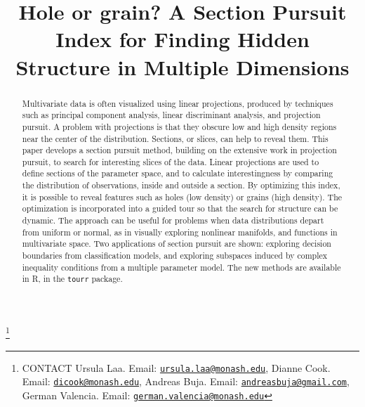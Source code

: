 \documentclass[]{interact}
\theoremstyle{plain}%
\theoremstyle{definition}
\theoremstyle{remark}
\begin{document}
\articletype{}

\title{Hole or grain? A Section Pursuit Index for Finding Hidden Structure in
Multiple Dimensions}


\author{
}

\thanks{CONTACT Ursula Laa. Email: \href{mailto:ursula.laa@monash.edu}{\nolinkurl{ursula.laa@monash.edu}}, Dianne Cook. Email: \href{mailto:dicook@monash.edu}{\nolinkurl{dicook@monash.edu}}, Andreas Buja. Email: \href{mailto:andreasbuja@gmail.com}{\nolinkurl{andreasbuja@gmail.com}}, German Valencia. Email: \href{mailto:german.valencia@monash.edu}{\nolinkurl{german.valencia@monash.edu}}}

\maketitle

\begin{abstract}
Multivariate data is often visualized using linear projections, produced
by techniques such as principal component analysis, linear discriminant
analysis, and projection pursuit. A problem with projections is that
they obscure low and high density regions near the center of the
distribution. Sections, or slices, can help to reveal them. This paper
develops a section pursuit method, building on the extensive work in
projection pursuit, to search for interesting slices of the data. Linear
projections are used to define sections of the parameter space, and to
calculate interestingness by comparing the distribution of observations,
inside and outside a section. By optimizing this index, it is possible
to reveal features such as holes (low density) or grains (high density).
The optimization is incorporated into a guided tour so that the search
for structure can be dynamic. The approach can be useful for problems
when data distributions depart from uniform or normal, as in visually
exploring nonlinear manifolds, and functions in multivariate space. Two
applications of section pursuit are shown: exploring decision boundaries
from classification models, and exploring subspaces induced by complex
inequality conditions from a multiple parameter model. The new methods
are available in R, in the \texttt{tourr} package.
\end{abstract}
\end{document}
